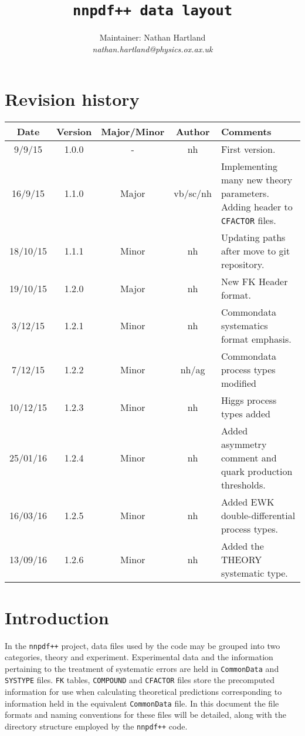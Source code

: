 \documentclass[11pt]{article}
\title{\tt{nnpdf++} data layout}
\author{Maintainer: Nathan Hartland\\ {\it nathan.hartland@physics.ox.ax.uk }}
\begin{document}
\maketitle
\tableofcontents
\clearpage
\section{Revision history}

\begin{table}[htp]
\begin{center}
\begin{tabular}{|c|c|c|c|p{50mm}|}
\hline
Date & Version & Major/Minor & Author & Comments\\
\hline\hline
9/9/15 & 1.0.0 & - & nh & First version.\\
\hline
16/9/15 & 1.1.0 & Major & vb/sc/nh & Implementing many \newline new theory parameters. \newline Adding header to {\tt CFACTOR} files.\\
\hline
18/10/15 & 1.1.1 & Minor & nh & Updating paths after move to git repository. \\
\hline
19/10/15 & 1.2.0 & Major & nh & New FK Header format. \\
\hline
3/12/15 & 1.2.1 & Minor & nh & Commondata systematics format emphasis. \\
\hline
7/12/15 & 1.2.2 & Minor & nh/ag & Commondata process types modified \\
\hline
10/12/15 & 1.2.3 & Minor & nh & Higgs process types added \\
\hline
25/01/16 & 1.2.4 & Minor & nh & Added asymmetry comment and quark production thresholds. \\
\hline
16/03/16 & 1.2.5 & Minor & nh & Added EWK double-differential process types. \\
\hline
13/09/16 & 1.2.6 & Minor & nh & Added the THEORY systematic type. \\
\hline
\end{tabular}
\end{center}
\label{tab:revsum}
\end{table}%

\clearpage

\section{Introduction}

In the {\tt nnpdf++} project, data files used by the code may be grouped into two categories, theory and experiment. Experimental data and the information pertaining to the treatment of systematic errors are held in {\tt CommonData} and {\tt SYSTYPE} files. {\tt FK} tables, {\tt COMPOUND} and {\tt CFACTOR} files store the precomputed information for use when calculating theoretical predictions corresponding to information held in the equivalent {\tt CommonData} file. In this document the file formats and naming conventions for these files will be detailed, along with the directory structure employed by the {\tt nnpdf++} code.
\end{document}
